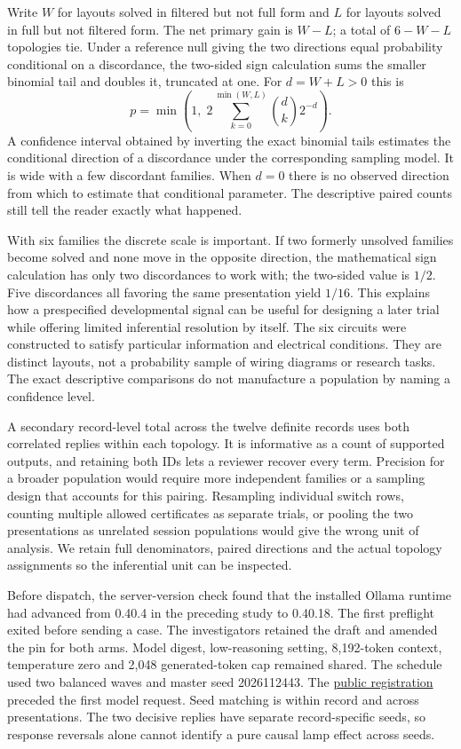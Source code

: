 \documentclass[12pt,letterpaper]{article}
\begin{document}
Write $W$ for layouts solved in filtered but not full form and $L$ for layouts solved in full but not filtered form. The net primary gain is $W-L$; a total of $6-W-L$ topologies tie. Under a reference null giving the two directions equal probability conditional on a discordance, the two-sided sign calculation sums the smaller binomial tail and doubles it, truncated at one. For $d=W+L>0$ this is
\[
 p=\min\!\left(1,\;2\sum_{k=0}^{\min(W,L)}\binom{d}{k}2^{-d}\right).
\]
A confidence interval obtained by inverting the exact binomial tails estimates the conditional direction of a discordance under the corresponding sampling model. It is wide with a few discordant families. When $d=0$ there is no observed direction from which to estimate that conditional parameter. The descriptive paired counts still tell the reader exactly what happened.

With six families the discrete scale is important. If two formerly unsolved families become solved and none move in the opposite direction, the mathematical sign calculation has only two discordances to work with; the two-sided value is $1/2$. Five discordances all favoring the same presentation yield $1/16$. This explains how a prespecified developmental signal can be useful for designing a later trial while offering limited inferential resolution by itself. The six circuits were constructed to satisfy particular information and electrical conditions. They are distinct layouts, not a probability sample of wiring diagrams or research tasks. The exact descriptive comparisons do not manufacture a population by naming a confidence level.

A secondary record-level total across the twelve definite records uses both correlated replies within each topology. It is informative as a count of supported outputs, and retaining both IDs lets a reviewer recover every term. Precision for a broader population would require more independent families or a sampling design that accounts for this pairing. Resampling individual switch rows, counting multiple allowed certificates as separate trials, or pooling the two presentations as unrelated session populations would give the wrong unit of analysis. We retain full denominators, paired directions and the actual topology assignments so the inferential unit can be inspected.



Before dispatch, the server-version check found that the installed Ollama runtime had advanced from 0.40.4 in the preceding study to 0.40.18. The first preflight exited before sending a case. The investigators retained the draft and amended the pin for both arms. Model digest, low-reasoning setting, 8,192-token context, temperature zero and 2,048 generated-token cap remained shared. The schedule used two balanced waves and master seed 2026112443. The \href{https://github.com/nousentllc/riemann-hypothesis/tree/1d2c10d165a35b57f173f6f3e0d7d777b00ee911/research/uriel/experiments/forced-reading-audit}{public registration} preceded the first model request. Seed matching is within record and across presentations. The two decisive replies have separate record-specific seeds, so response reversals alone cannot identify a pure causal lamp effect across seeds.
\end{document}
